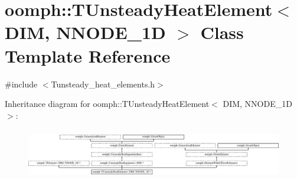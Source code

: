 \hypertarget{classoomph_1_1TUnsteadyHeatElement}{}\section{oomph\+:\+:T\+Unsteady\+Heat\+Element$<$ D\+IM, N\+N\+O\+D\+E\+\_\+1D $>$ Class Template Reference}
\label{classoomph_1_1TUnsteadyHeatElement}


{\ttfamily \#include $<$Tunsteady\+\_\+heat\+\_\+elements.\+h$>$}

Inheritance diagram for oomph\+:\+:T\+Unsteady\+Heat\+Element$<$ D\+IM, N\+N\+O\+D\+E\+\_\+1D $>$\+:\begin{figure}[H]
\begin{center}
\leavevmode
\includegraphics[height=2.215190cm]{classoomph_1_1TUnsteadyHeatElement}
\end{center}
\end{figure}
